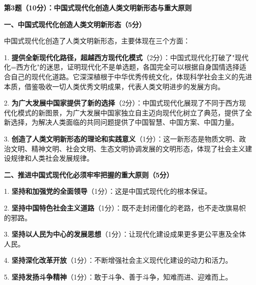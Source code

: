 \documentclass[12pt, a4paper]{article}
\begin{document}
\begin{answerbox}

\textbf{第3题（10分）：中国式现代化创造人类文明新形态与重大原则}

\textbf{一、中国式现代化创造人类文明新形态（5分）}

中国式现代化创造了人类文明新形态，主要体现在三个方面：

1. \textbf{提供全新现代化路径，超越西方现代化模式}（2分）：中国式现代化打破了"现代化=西方化"的迷思，证明现代化不是单选题，各国完全可以根据自身国情选择适合自己的现代化道路。它深深植根于中华优秀传统文化，体现科学社会主义的先进本质，借鉴吸收一切人类优秀文明成果，代表人类文明进步的发展方向。

2. \textbf{为广大发展中国家提供了新的选择}（2分）：中国式现代化展现了不同于西方现代化模式的新图景，为广大发展中国家独立自主迈向现代化树立了典范，提供了全新选择，为解决人类面临的共同问题提供了中国智慧、中国方案、中国力量。

3. \textbf{创造了人类文明新形态的理论和实践意义}（1分）：这一新形态是物质文明、政治文明、精神文明、社会文明、生态文明协调发展的文明形态，体现了社会主义建设规律和人类社会发展规律。

\textbf{二、推进中国式现代化必须牢牢把握的重大原则（5分）}

1. \textbf{坚持和加强党的全面领导}（1分）：这是中国式现代化的根本保证。

2. \textbf{坚持中国特色社会主义道路}（1分）：既不走封闭僵化的老路，也不走改旗易帜的邪路。

3. \textbf{坚持以人民为中心的发展思想}（1分）：让现代化建设成果更多更公平惠及全体人民。

4. \textbf{坚持深化改革开放}（1分）：不断增强社会主义现代化建设的动力和活力。

5. \textbf{坚持发扬斗争精神}（1分）：敢于斗争、善于斗争，知难而进、迎难而上。

\end{answerbox}

\vspace{6pt}
\end{document}

